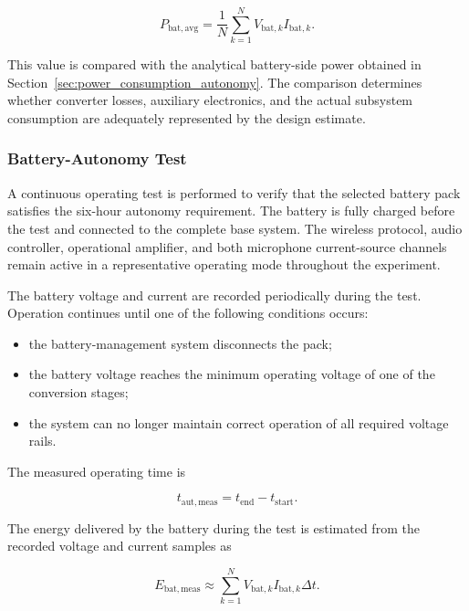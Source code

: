 \begin{equation}
    P_{\mathrm{bat,avg}}
    =
    \frac{1}{N}
    \sum_{k=1}^{N}
    V_{\mathrm{bat},k}I_{\mathrm{bat},k}.
    \label{eq:average_measured_battery_power}
\end{equation}

This value is compared with the analytical battery-side power obtained in Section~\ref{sec:power_consumption_autonomy}. The comparison determines whether converter losses, auxiliary electronics, and the actual subsystem consumption are adequately represented by the design estimate.

\subsubsection{Battery-Autonomy Test}

A continuous operating test is performed to verify that the selected battery pack satisfies the six-hour autonomy requirement. The battery is fully charged before the test and connected to the complete base system. The wireless protocol, audio controller, operational amplifier, and both microphone current-source channels remain active in a representative operating mode throughout the experiment.

The battery voltage and current are recorded periodically during the test. Operation continues until one of the following conditions occurs:

\begin{itemize}
    \item the battery-management system disconnects the pack;
    \item the battery voltage reaches the minimum operating voltage of one of the conversion stages;
    \item the system can no longer maintain correct operation of all required voltage rails.
\end{itemize}

The measured operating time is

\begin{equation}
    t_{\mathrm{aut,meas}}
    =
    t_{\mathrm{end}}-t_{\mathrm{start}}.
    \label{eq:measured_autonomy}
\end{equation}

The energy delivered by the battery during the test is estimated from the recorded voltage and current samples as

\begin{equation}
    E_{\mathrm{bat,meas}}
    \approx
    \sum_{k=1}^{N}
    V_{\mathrm{bat},k}
    I_{\mathrm{bat},k}
    \Delta t.
    \label{eq:measured_battery_energy}
\end{equation}

